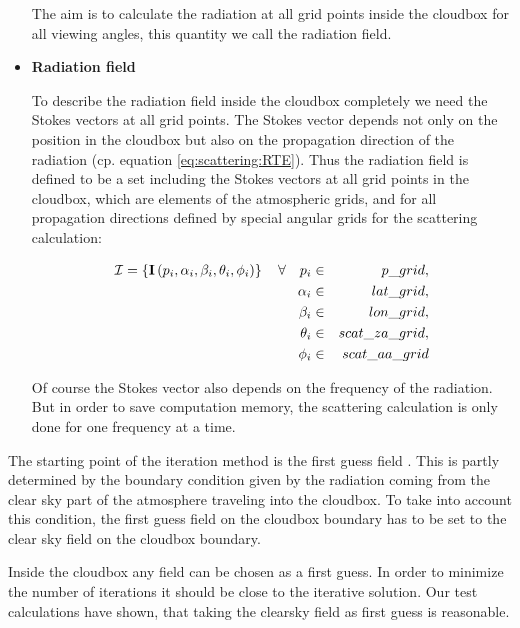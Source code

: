\begin{itemize}
The aim is to calculate the radiation at all grid points inside the cloudbox for all viewing angles, this quantity we call the radiation field. 

\item{\bf Radiation field}

To describe the radiation field inside the cloudbox completely we need the Stokes vectors at all grid points. The Stokes vector depends not only on the position in the cloudbox but also on the propagation direction of the radiation (cp. equation \ref{eq:scattering:RTE}). Thus the radiation field is defined to be a set including the Stokes vectors at all grid points in the cloudbox, which are elements of the atmospheric grids, and for all propagation directions defined by special angular grids for the scattering calculation: 

\begin{eqnarray}
{\mathcal I} = \left\{ {\bf I} \left( p_i, \alpha_i, \beta_i, \theta_i, \phi_i\right)\right\}   \quad
\forall \quad p_i &\in& p\_grid,\\
 \alpha_i &\in& lat\_grid, \\
 \beta_i &\in& lon\_grid, \\
 \theta_i &\in& scat\_za\_grid, \\
 \phi_i &\in& scat\_aa\_grid 
\end{eqnarray}

Of course the Stokes vector also depends on the frequency of the radiation. But in order to save computation memory, the scattering calculation is only done for one frequency at a time.

\end{itemize}



The starting point of the iteration method is the first guess field  . This is partly determined by the boundary condition given by the radiation coming from the clear
sky part of the atmosphere traveling into the cloudbox. To take into
account this condition, the first guess field on the cloudbox boundary
has to be set to the clear sky field on the cloudbox boundary. 

Inside
the cloudbox any field can be chosen as a first guess. In order to minimize the number of iterations it should be close to the iterative solution. Our test calculations have shown, that taking the clearsky field as first guess is reasonable.


